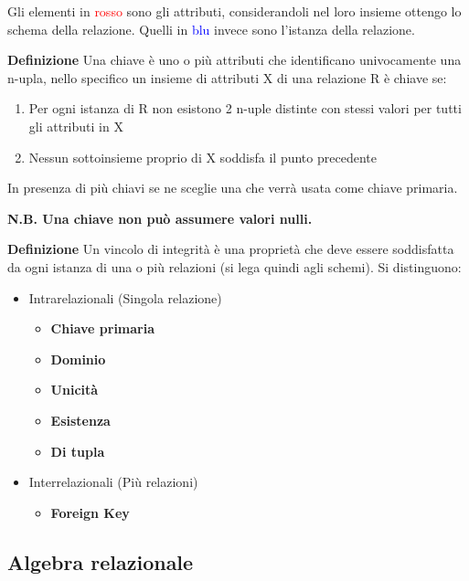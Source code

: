 \documentclass{article}
\begin{document}
\noindent Gli elementi in \textcolor{red}{rosso} sono gli attributi, considerandoli nel loro insieme ottengo lo schema della relazione. Quelli in \textcolor{blue}{blu} invece sono l'istanza della relazione.\newline

\noindent\textbf{Definizione} Una chiave è uno o più attributi che identificano univocamente una n-upla, nello specifico un insieme di attributi X di una relazione R è chiave se:
\begin{enumerate}
    \item Per ogni istanza di R non esistono 2 n-uple distinte con stessi valori per tutti gli attributi in X
    \item Nessun sottoinsieme proprio di X soddisfa il punto precedente
\end{enumerate}

\noindent In presenza di più chiavi se ne sceglie una che verrà usata come chiave primaria.\newline

\noindent\textbf{N.B. Una chiave non può assumere valori nulli.}\newline

\noindent\textbf{Definizione} Un vincolo di integrità è una proprietà che deve essere soddisfatta da ogni istanza di una o più relazioni (si lega quindi agli schemi). Si distinguono:
\begin{itemize}
    \item Intrarelazionali (Singola relazione)
        \begin{itemize}
            \item \textbf{Chiave primaria}
            \item \textbf{Dominio}
            \item \textbf{Unicità}
            \item \textbf{Esistenza}
            \item \textbf{Di tupla}
        \end{itemize}
    \item Interrelazionali (Più relazioni)
        \begin{itemize}
            \item \textbf{Foreign Key}
        \end{itemize}
\end{itemize}

\subsection{Algebra relazionale}
\end{document}
